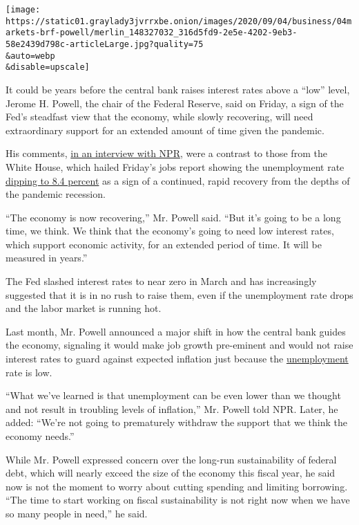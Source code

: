 \texttt{[image: https://static01.graylady3jvrrxbe.onion/images/2020/09/04/business/04markets-brf-powell/merlin\_148327032\_316d5fd9-2e5e-4202-9eb3-58e2439d798c-articleLarge.jpg?quality=75\\\&auto=webp\\\&disable=upscale]}

It could be years before the central bank raises interest rates above a
``low'' level, Jerome H. Powell, the chair of the Federal Reserve, said
on Friday, a sign of the Fed's steadfast view that the economy, while
slowly recovering, will need extraordinary support for an extended
amount of time given the pandemic.

His comments,
\href{https://www.npr.org/2020/09/04/909627932/feds-jerome-powell-jobless-rate-better-than-expected-recovery-to-take-a-long-tim}{in
an interview with NPR}, were a contrast to those from the White House,
which hailed Friday's jobs report showing the unemployment rate
\href{https://www.nytimes3xbfgragh.onion/live/2020/09/04/business/stock-market-today-coronavirus\#jobs-report-august-2020}{dipping
to 8.4 percent} as a sign of a continued, rapid recovery from the depths
of the pandemic recession.

``The economy is now recovering,'' Mr. Powell said. ``But it's going to
be a long time, we think. We think that the economy's going to need low
interest rates, which support economic activity, for an extended period
of time. It will be measured in years.''

The Fed slashed interest rates to near zero in March and has
increasingly suggested that it is in no rush to raise them, even if the
unemployment rate drops and the labor market is running hot.

Last month, Mr. Powell announced a major shift in how the central bank
guides the economy, signaling it would make job growth pre-eminent and
would not raise interest rates to guard against expected inflation just
because the
\href{https://www.nytimes3xbfgragh.onion/2020/08/27/business/economy/unemployment-claims.html}{unemployment}
rate is low.

``What we've learned is that unemployment can be even lower than we
thought and not result in troubling levels of inflation,'' Mr. Powell
told NPR. Later, he added: ``We're not going to prematurely withdraw the
support that we think the economy needs.''

While Mr. Powell expressed concern over the long-run sustainability of
federal debt, which will nearly exceed the size of the economy this
fiscal year, he said now is not the moment to worry about cutting
spending and limiting borrowing. ``The time to start working on fiscal
sustainability is not right now when we have so many people in need,''
he said.

